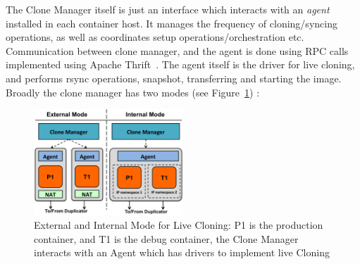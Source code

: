 The Clone Manager itself is just an interface which interacts with an \textit{agent} installed in each container host.
It manages the frequency of cloning/syncing operations, as well as  coordinates setup operations/orchestration etc.
Communication between clone manager, and the agent is done using RPC calls implemented using Apache Thrift~\cite{thrift}.
The agent itself is the driver for live cloning, and performs rsync operations, snapshot, transferring and starting the image.
\fi
Broadly the clone manager has two modes (see Figure~\ref{fig:modesCloning}) : 

\begin{figure}[t]
  \begin{center}
    \includegraphics[width=0.5\textwidth]{figs/ModesCloning.png}
    \caption{External and Internal Mode for Live Cloning: P1 is the production container, and T1 is the debug container, the Clone Manager interacts with an Agent which has drivers to implement live Cloning}
    \label{fig:modesCloning}
  \end{center}
\end{figure}

